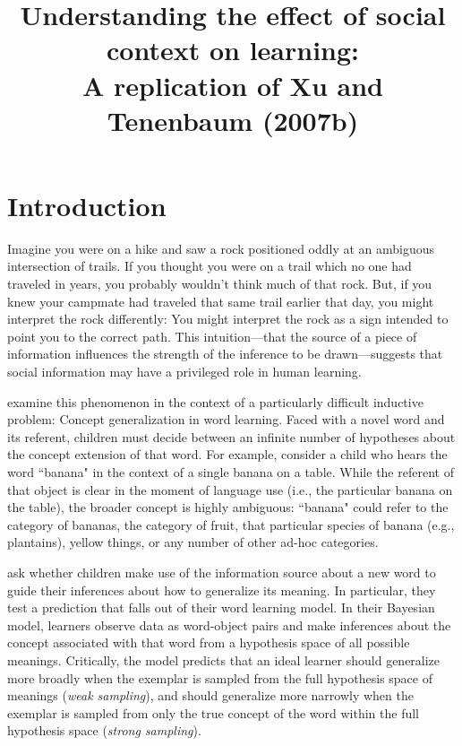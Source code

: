 \documentclass[man]{apa2}
\title{Understanding the effect of social context on learning: \\ A replication of Xu and Tenenbaum (2007b)}
\begin{document}
\maketitle              


\section{Introduction}
Imagine you were on a hike and saw a rock positioned oddly at an ambiguous intersection of trails.  If you thought you were on a trail  which no one had traveled in years, you probably wouldn't think much of that rock. But, if you knew your  campmate had traveled that same trail earlier that day, you might interpret the rock differently: You might interpret the rock as a sign intended to point you to the correct path. This intuition---that the  source of a piece of information influences the strength of the inference to be drawn---suggests that social information may have a privileged role in human learning.

 examine this phenomenon in the context of a particularly difficult inductive problem: Concept generalization in word learning. Faced with a novel word and its referent, children must decide between an infinite number of hypotheses about the concept extension of that word. For example, consider a child who hears the word  ``banana" in the context of a single banana on a table. While the referent of that object is clear in the moment of language use (i.e., the particular banana on the table), the broader concept is highly ambiguous: ``banana" could refer to the category of bananas, the category of fruit, that particular species of banana (e.g., plantains), yellow things, or any number of other ad-hoc categories. 

 ask whether children make use of the information source about a new word to guide their inferences about how to generalize its meaning. In particular, they test a prediction that falls out of their word learning model. In their Bayesian model, learners observe data as word-object pairs and make inferences about the concept associated with that word from a hypothesis space of all possible meanings. Critically, the model predicts that  an ideal  learner should generalize more broadly when the exemplar is sampled from the full hypothesis space of meanings ({\it weak sampling}), and should generalize more narrowly when the exemplar is sampled from only  the true concept of the word within the full hypothesis space ({\it strong sampling}). 
\end{document}
